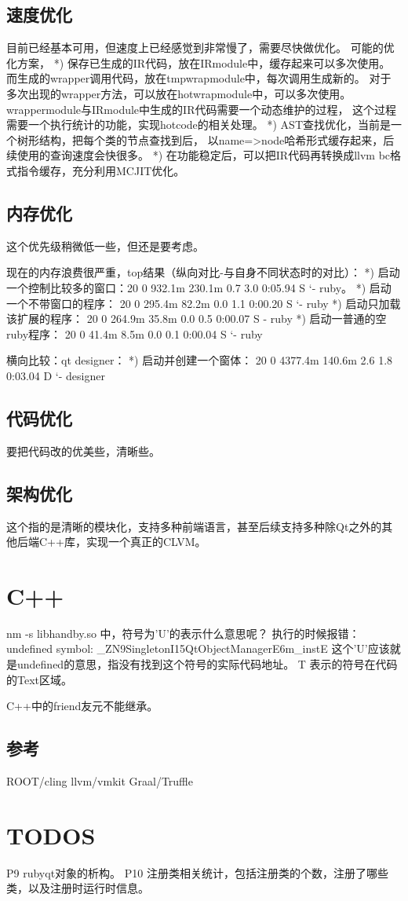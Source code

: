 \section{速度优化}
目前已经基本可用，但速度上已经感觉到非常慢了，需要尽快做优化。
可能的优化方案，
*) 保存已生成的IR代码，放在IRmodule中，缓存起来可以多次使用。
而生成的wrapper调用代码，放在tmpwrapmodule中，每次调用生成新的。
对于多次出现的wrapper方法，可以放在hotwrapmodule中，可以多次使用。
wrappermodule与IRmodule中生成的IR代码需要一个动态维护的过程，
这个过程需要一个执行统计的功能，实现hotcode的相关处理。
*) AST查找优化，当前是一个树形结构，把每个类的节点查找到后，
以name=>node哈希形式缓存起来，后续使用的查询速度会快很多。
*) 在功能稳定后，可以把IR代码再转换成llvm bc格式指令缓存，充分利用MCJIT优化。


\section{内存优化}
这个优先级稍微低一些，但还是要考虑。

现在的内存浪费很严重，top结果（纵向对比-与自身不同状态时的对比）：
*) 启动一个控制比较多的窗口：20   0  932.1m 230.1m   0.7  3.0   0:05.94 S   `- ruby。
*) 启动一个不带窗口的程序： 20   0  295.4m  82.2m   0.0  1.1   0:00.20 S    `- ruby
*) 启动只加载该扩展的程序： 20   0  264.9m  35.8m   0.0  0.5   0:00.07 S    - ruby
*) 启动一普通的空ruby程序： 20   0   41.4m   8.5m   0.0  0.1   0:00.04 S   `- ruby

横向比较：qt designer：
*) 启动并创建一个窗体： 20   0 4377.4m 140.6m   2.6  1.8   0:03.04 D    `- designer

\section{代码优化}
要把代码改的优美些，清晰些。

\section{架构优化}
这个指的是清晰的模块化，支持多种前端语言，甚至后续支持多种除Qt之外的其他后端C++库，实现一个真正的CLVM。


\chapter{C++}
nm -s libhandby.so 中，符号为'U'的表示什么意思呢？
执行的时候报错：undefined symbol: \_ZN9SingletonI15QtObjectManagerE6m\_instE
这个'U'应该就是undefined的意思，指没有找到这个符号的实际代码地址。
T 表示的符号在代码的Text区域。

C++中的friend友元不能继承。

\section{参考}
ROOT/cling
llvm/vmkit
Graal/Truffle

\chapter{TODOS}
P9  rubyqt对象的析构。
P10 注册类相关统计，包括注册类的个数，注册了哪些类，以及注册时运行时信息。

